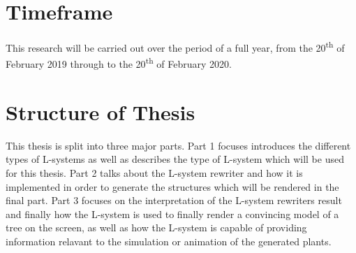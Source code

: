\section{Timeframe}

\begin{flushleft}

This research will be carried out over the period of a full year, from the 20\textsuperscript{th} of February 2019 through to the 20\textsuperscript{th} of February 2020. 

\end{flushleft}

\section{Structure of Thesis}

\begin{flushleft}

This thesis is split into three major parts. Part 1 focuses introduces the different types of L-systems as well as describes the type of L-system which will be used for this thesis. Part 2 talks about the L-system rewriter and how it is implemented in order to generate the structures which will be rendered in the final part. Part 3 focuses on the interpretation of the L-system rewriters result and finally how the L-system is used to finally render a convincing model of a tree on the screen, as well as how the L-system is capable of providing information relavant to the simulation or animation of the generated plants.

\end{flushleft}





